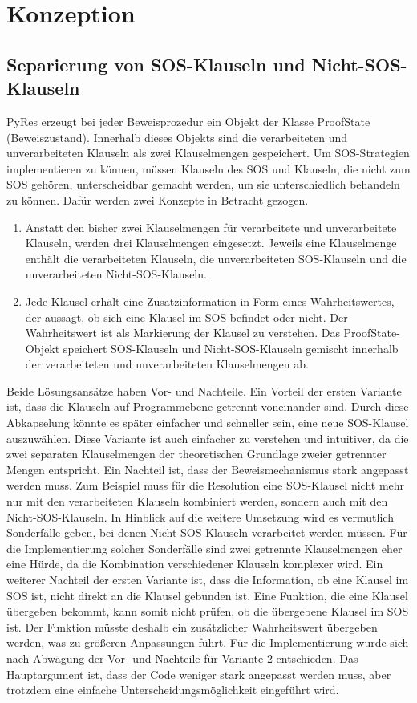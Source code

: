 
\chapter{Konzeption}

\section{Separierung von SOS-Klauseln und Nicht-SOS-Klauseln}

PyRes erzeugt bei jeder Beweisprozedur ein Objekt der Klasse ProofState (Beweiszustand). Innerhalb dieses Objekts sind die verarbeiteten und unverarbeiteten Klauseln als zwei Klauselmengen gespeichert. Um SOS-Strategien implementieren zu können, müssen Klauseln des SOS und Klauseln, die nicht zum SOS gehören, unterscheidbar gemacht werden, um sie unterschiedlich behandeln zu können. Dafür werden zwei Konzepte in Betracht gezogen.
\begin{enumerate}
	\item Anstatt den bisher zwei Klauselmengen für verarbeitete und unverarbeitete Klauseln, werden drei Klauselmengen eingesetzt. Jeweils eine Klauselmenge enthält die verarbeiteten Klauseln, die unverarbeiteten SOS-Klauseln und die unverarbeiteten Nicht-SOS-Klauseln.
	\item Jede Klausel erhält eine Zusatzinformation in Form eines Wahrheitswertes, der aussagt, ob sich eine Klausel im SOS befindet oder nicht. Der Wahrheitswert ist als Markierung der Klausel zu verstehen. Das ProofState-Objekt speichert SOS-Klauseln und Nicht-SOS-Klauseln gemischt innerhalb der verarbeiteten und unverarbeiteten Klauselmengen ab.
\end{enumerate}
Beide Lösungsansätze haben Vor- und Nachteile. Ein Vorteil der ersten Variante ist, dass die Klauseln auf Programmebene getrennt voneinander sind. Durch diese Abkapselung könnte es später einfacher und schneller sein, eine neue SOS-Klausel auszuwählen. Diese Variante ist auch einfacher zu verstehen und intuitiver, da die zwei separaten Klauselmengen der theoretischen Grundlage zweier getrennter Mengen entspricht. Ein Nachteil ist, dass der Beweismechanismus stark angepasst werden muss. Zum Beispiel muss für die Resolution eine SOS-Klausel nicht mehr nur mit den verarbeiteten Klauseln kombiniert werden, sondern auch mit den Nicht-SOS-Klauseln. In Hinblick auf die weitere Umsetzung wird es vermutlich Sonderfälle geben, bei denen Nicht-SOS-Klauseln verarbeitet werden müssen. Für die Implementierung solcher Sonderfälle sind zwei getrennte Klauselmengen eher eine Hürde, da die Kombination verschiedener Klauseln komplexer wird. Ein weiterer Nachteil der ersten Variante ist, dass die Information, ob eine Klausel im SOS ist, nicht direkt an die Klausel gebunden ist. Eine Funktion, die eine Klausel übergeben bekommt, kann somit nicht prüfen, ob die übergebene Klausel im SOS ist. Der Funktion müsste deshalb ein zusätzlicher Wahrheitswert übergeben werden, was zu größeren Anpassungen führt.
Für die Implementierung wurde sich nach Abwägung der Vor- und Nachteile für Variante 2 entschieden. Das Hauptargument ist, dass der Code weniger stark angepasst werden muss, aber trotzdem eine einfache Unterscheidungsmöglichkeit eingeführt wird.

